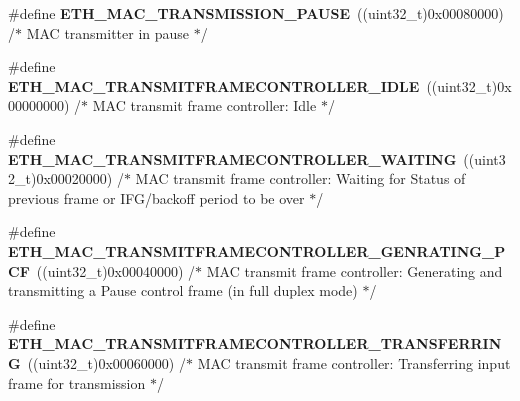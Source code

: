\begin{DoxyCompactItemize}
\item 
\hypertarget{group___h_a_l___e_t_h___aliased___defines_ga858c30b0c902a609fbf5e9de54c873fc}{\#define {\bfseries E\-T\-H\-\_\-\-M\-A\-C\-\_\-\-T\-R\-A\-N\-S\-M\-I\-S\-S\-I\-O\-N\-\_\-\-P\-A\-U\-S\-E}~((uint32\-\_\-t)0x00080000)  /$\ast$ M\-A\-C transmitter in pause $\ast$/}\label{group___h_a_l___e_t_h___aliased___defines_ga858c30b0c902a609fbf5e9de54c873fc}

\item 
\hypertarget{group___h_a_l___e_t_h___aliased___defines_ga3b6682322869b2f8ff8a34239418b229}{\#define {\bfseries E\-T\-H\-\_\-\-M\-A\-C\-\_\-\-T\-R\-A\-N\-S\-M\-I\-T\-F\-R\-A\-M\-E\-C\-O\-N\-T\-R\-O\-L\-L\-E\-R\-\_\-\-I\-D\-L\-E}~((uint32\-\_\-t)0x00000000)  /$\ast$ M\-A\-C transmit frame controller\-: Idle $\ast$/}\label{group___h_a_l___e_t_h___aliased___defines_ga3b6682322869b2f8ff8a34239418b229}

\item 
\hypertarget{group___h_a_l___e_t_h___aliased___defines_ga51af5af4f0244add557e29f1c1085c76}{\#define {\bfseries E\-T\-H\-\_\-\-M\-A\-C\-\_\-\-T\-R\-A\-N\-S\-M\-I\-T\-F\-R\-A\-M\-E\-C\-O\-N\-T\-R\-O\-L\-L\-E\-R\-\_\-\-W\-A\-I\-T\-I\-N\-G}~((uint32\-\_\-t)0x00020000)  /$\ast$ M\-A\-C transmit frame controller\-: Waiting for Status of previous frame or I\-F\-G/backoff period to be over $\ast$/}\label{group___h_a_l___e_t_h___aliased___defines_ga51af5af4f0244add557e29f1c1085c76}

\item 
\hypertarget{group___h_a_l___e_t_h___aliased___defines_ga30f5421c685cc87345a62034f03e9ede}{\#define {\bfseries E\-T\-H\-\_\-\-M\-A\-C\-\_\-\-T\-R\-A\-N\-S\-M\-I\-T\-F\-R\-A\-M\-E\-C\-O\-N\-T\-R\-O\-L\-L\-E\-R\-\_\-\-G\-E\-N\-R\-A\-T\-I\-N\-G\-\_\-\-P\-C\-F}~((uint32\-\_\-t)0x00040000)  /$\ast$ M\-A\-C transmit frame controller\-: Generating and transmitting a Pause control frame (in full duplex mode) $\ast$/}\label{group___h_a_l___e_t_h___aliased___defines_ga30f5421c685cc87345a62034f03e9ede}

\item 
\hypertarget{group___h_a_l___e_t_h___aliased___defines_ga813acc11409391a70e9c8f4e2c769cf1}{\#define {\bfseries E\-T\-H\-\_\-\-M\-A\-C\-\_\-\-T\-R\-A\-N\-S\-M\-I\-T\-F\-R\-A\-M\-E\-C\-O\-N\-T\-R\-O\-L\-L\-E\-R\-\_\-\-T\-R\-A\-N\-S\-F\-E\-R\-R\-I\-N\-G}~((uint32\-\_\-t)0x00060000)  /$\ast$ M\-A\-C transmit frame controller\-: Transferring input frame for transmission $\ast$/}\label{group___h_a_l___e_t_h___aliased___defines_ga813acc11409391a70e9c8f4e2c769cf1}


\end{DoxyCompactItemize}
